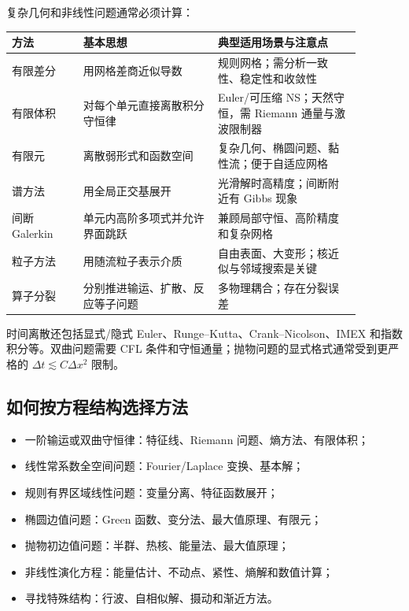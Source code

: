 \documentclass[cn,hazy,blue,11pt,normal]{elegantnote}
\numberwithin{equation}{section}
\begin{document}
复杂几何和非线性问题通常必须计算：
\begin{center}
\renewcommand{\arraystretch}{1.3}
\begin{tabular}{>{\raggedright\arraybackslash}p{0.18\linewidth}
                >{\raggedright\arraybackslash}p{0.34\linewidth}
                >{\raggedright\arraybackslash}p{0.36\linewidth}}
\toprule
方法 & 基本思想 & 典型适用场景与注意点 \\
\midrule
有限差分 & 用网格差商近似导数 & 规则网格；需分析一致性、稳定性和收敛性 \\
有限体积 & 对每个单元直接离散积分守恒律 & Euler/可压缩 NS；天然守恒，需 Riemann 通量与激波限制器 \\
有限元 & 离散弱形式和函数空间 & 复杂几何、椭圆问题、黏性流；便于自适应网格 \\
谱方法 & 用全局正交基展开 & 光滑解时高精度；间断附近有 Gibbs 现象 \\
间断 Galerkin & 单元内高阶多项式并允许界面跳跃 & 兼顾局部守恒、高阶精度和复杂网格 \\
粒子方法 & 用随流粒子表示介质 & 自由表面、大变形；核近似与邻域搜索是关键 \\
算子分裂 & 分别推进输运、扩散、反应等子问题 & 多物理耦合；存在分裂误差 \\
\bottomrule
\end{tabular}
\end{center}
时间离散还包括显式/隐式 Euler、Runge--Kutta、Crank--Nicolson、IMEX 和指数积分等。双曲问题需要 CFL 条件和守恒通量；抛物问题的显式格式通常受到更严格的 $\Delta t\lesssim C\Delta x^2$ 限制。

\subsection{如何按方程结构选择方法}

\begin{itemize}
 \item 一阶输运或双曲守恒律：特征线、Riemann 问题、熵方法、有限体积；
 \item 线性常系数全空间问题：Fourier/Laplace 变换、基本解；
 \item 规则有界区域线性问题：变量分离、特征函数展开；
 \item 椭圆边值问题：Green 函数、变分法、最大值原理、有限元；
 \item 抛物初边值问题：半群、热核、能量法、最大值原理；
 \item 非线性演化方程：能量估计、不动点、紧性、熵解和数值计算；
 \item 寻找特殊结构：行波、自相似解、摄动和渐近方法。
\end{itemize}
\end{document}
